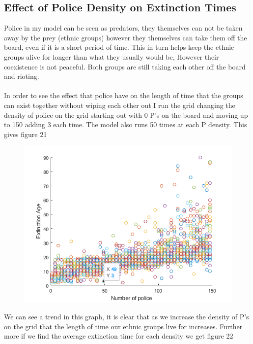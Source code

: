 \documentclass[11pt]{article}
\begin{document}
\subsection{Effect of Police Density on Extinction Times}
Police in my model can be seen as predators, they themselves can not be taken away by the prey (ethnic groups) however they themselves can take them off the board, even if it is a short period of time. This in turn helps keep the ethnic groups alive for longer than what they usually would be, However their coexistence is not peaceful. Both groups are still taking each other off the board and rioting. \\
\\
In order to see the effect that police have on the length of time that the groups can exist together without wiping each other out I run the grid changing the density of police on the grid starting out with 0 P's on the board and moving up to 150 adding 3 each time. The model also runs 50 times at each P density. This gives figure 21


\begin{figure}[H]
	\includegraphics[width=\linewidth]{Extintion Age vs Police Density.png}
	\caption{}
	\label{fig:frenchriot}
\end{figure}
We can see a trend in this graph, it is clear that as we increase the density of P's on the grid that the length of time our ethnic groups live for increases. Further more if we find the average extinction time for each density we get figure 22
\end{document}
